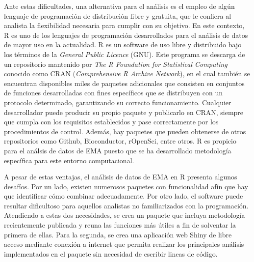 Ante estas dificultades, una alternativa para el análisis es el empleo de algún lenguaje de programación de distribución libre y gratuita, que le confiera al analista la flexibilidad necesaria para cumplir con su objetivo. En este contexto, R es uno de los lenguajes de programación desarrollados para el análisis de datos de mayor uso en la actualidad. R es un software de uso libre y distribuido bajo los términos de la \emph{General Public Licence} (GNU). Este programa se descarga de un repositorio mantenido por \emph{The R Foundation for Statistical Computing} conocido como CRAN (\emph{Comprehensive R Archive Network}), en el cual también se encuentran disponibles miles de paquetes adicionales que consisten en conjuntos de funciones desarrolladas con fines específicos que se distribuyen con un protocolo determinado, garantizando su correcto funcionamiento. Cualquier desarrollador puede producir su propio paquete y publicarlo en CRAN, siempre que cumpla con los requisitos establecidos y pase correctamente por los procedimientos de control. Además, hay paquetes que pueden obtenerse de otros repositorios como Github, Bioconductor, rOpenSci, entre otros. R es propicio para el análsis de datos de EMA puesto que se ha desarrollado metodología específica para este entorno computacional. 

A pesar de estas ventajas, el análisis de datos de EMA en R presenta algunos desafíos. Por un lado, existen numerosos paquetes con funcionalidad afín que hay que identificar cómo combinar adecuadamente. Por otro lado, el software puede resultar dificultoso para aquellos analistas no familiarizados con la programación. Atendiendo a estas dos necesidades, se crea un paquete que incluya metodología recientemente publicada y reuna las funciones más útiles a fin de solventar la primera de ellas. Para la segunda, se crea una aplicación web Shiny de libre acceso mediante conexión a internet que permita realizar los principales análisis implementados en el paquete sin necesidad de escribir lineas de código. 
